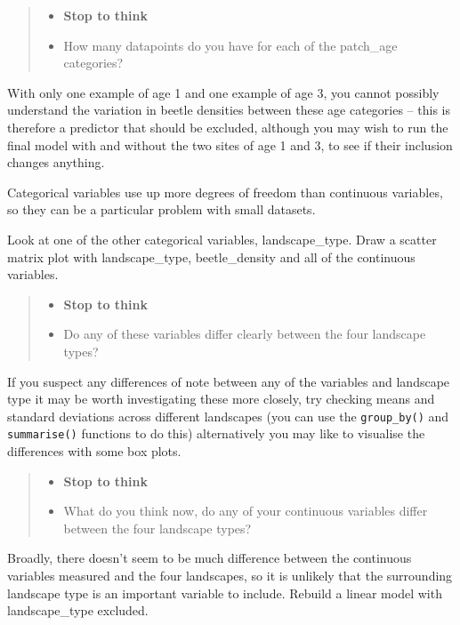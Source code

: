 \documentclass[
]{book}
\providecommand{\tightlist}{%
  \setlength{\itemsep}{0pt}\setlength{\parskip}{0pt}}
\begin{document}
\begin{quote}
\begin{itemize}
\tightlist
\item
  \textbf{Stop to think}
\item
  How many datapoints do you have for each of the patch\_age categories?
\end{itemize}
\end{quote}

With only one example of age 1 and one example of age 3, you cannot possibly understand the variation in beetle densities between these age categories -- this is therefore a predictor that should be excluded, although you may wish to run the final model with and without the two sites of age 1 and 3, to see if their inclusion changes anything.

Categorical variables use up more degrees of freedom than continuous variables, so they can be a particular problem with small datasets.

Look at one of the other categorical variables, landscape\_type. Draw a scatter matrix plot with landscape\_type, beetle\_density and all of the continuous variables.

\begin{quote}
\begin{itemize}
\tightlist
\item
  \textbf{Stop to think}
\item
  Do any of these variables differ clearly between the four landscape types?
\end{itemize}
\end{quote}

If you suspect any differences of note between any of the variables and landscape type it may be worth investigating these more closely, try checking means and standard deviations across different landscapes (you can use the \texttt{group\_by()} and \texttt{summarise()} functions to do this) alternatively you may like to visualise the differences with some box plots.

\begin{quote}
\begin{itemize}
\tightlist
\item
  \textbf{Stop to think}
\item
  What do you think now, do any of your continuous variables differ between the four landscape types?
\end{itemize}
\end{quote}

Broadly, there doesn't seem to be much difference between the continuous variables measured and the four landscapes, so it is unlikely that the surrounding landscape type is an important variable to include. Rebuild a linear model with landscape\_type excluded.
\end{document}
